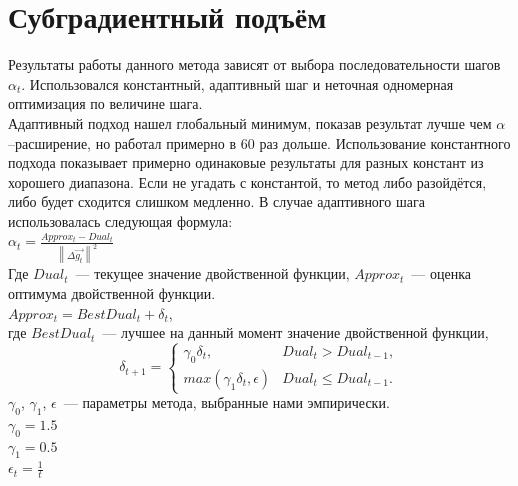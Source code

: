 \documentclass{article}
\begin{document}
\section{Субградиентный подъём}
Результаты работы данного метода зависят от выбора
последовательности шагов $\alpha_t$.
Использовался константный, адаптивный шаг и неточная
одномерная оптимизация по величине шага.\\
Адаптивный подход нашел глобальный минимум,
показав результат лучше чем $\alpha$--расширение,
но работал примерно в $60$ раз дольше.
Использование константного подхода показывает
примерно одинаковые результаты для разных констант
из хорошего диапазона. Если не угадать с константой,
то метод либо разойдётся, либо будет сходится слишком медленно.
В случае адаптивного шага использовалась следующая формула:\\
$\alpha_t = \frac{Approx_t - Dual_t}{\left \| \Delta \overrightarrow{g_t} \right \|^2}$\\
Где $Dual_t$~--- текущее значение двойственной функции, 
$Approx_t$~--- оценка оптимума двойственной функции.\\
$Approx_t = BestDual_t + \delta_t$,\\
где $BestDual_t$~--- лучшее на данный момент значение двойственной функции,\\
\begin{equation}
    \delta_{t+1} = \begin{cases}
    \gamma_0 \delta_t, & Dual_t > Dual_{t-1},\\
    max(\gamma_1 \delta_t, \epsilon) & Dual_t \leqslant  Dual_{t-1}.
    \end{cases}
\end{equation}
$\gamma_0$, $\gamma_1$, $\epsilon$~--- параметры метода, выбранные нами эмпирически.\\
$\gamma_0 = 1.5$\\
$\gamma_1 = 0.5$\\
$\epsilon_t = \frac{1}{t}$\\
\end{document}
